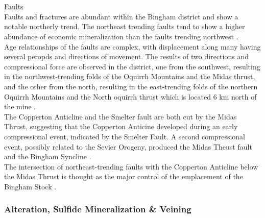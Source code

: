 \documentclass[a4paper,11pt,titlepage]{article}
\begin{document}
\\
\\\underline{Faults}
\\ Faults and fractures are abundant within the Bingham district and show a notable northerly trend. The northeast trending faults tend to show a higher abundance of economic mineralization than the faults trending northwest \citep{Boutwell1905}.
\\Age relationships of the faults are complex, with displacement along many having several peropds and directions of movement.  The results of two directions and compressional force are observed in the district, one from the southwest, resulting in the northwest-trending folds of the Oquirrh Mountains and the Midas thrust, and the other from the north, resulting in the east-trending folds of the northern Oquirrh Mountains and the North oquirrh thrust which is located 6 km north of the mine \citep{Lanier1978}. 
\\The Copperton Anticline and the Smelter fault are both cut by the Midas Thrust, suggesting that the Copperton Anticine developed during an early compressional event, indicated by the Smelter Fault. A second compressional event, possibly related to the Sevier Orogeny, produced the Midas Theust fault and the Bingham Syncline \citep{Babcock1995}.
\\The intersection of northeast-trending faults with the Copperton Anticline below the Midas Thrust is thought as the major control of the emplacement of the Bingham Stock \citep{Lanier1978}.

\subsubsection{Alteration, Sulfide Mineralization \& Veining}
\end{document}
